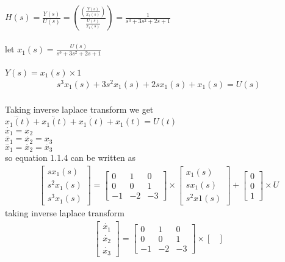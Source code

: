 \begin{enumerate}[label=\thesection.\arabic*.,ref=\thesection.\theenumi]
\\
\\ $H(s)=\frac{Y(s)}{U(s)}=(\frac{(\frac{Y(s)}{x_{1}(s)})}{\frac{U(s)}{x_{1}(s)}})=\frac{1}{s^3+3s^2+2s+1} $
\\
\\let   $x_{1}(s)=\frac{U(s)}{s^3+3s^2+2s+1}$
\\
\\$Y(s)=x_{1}(s)\times 1 $
\begin{align}
s^3x_{1}(s)+3s^2x_{1}(s)+2sx_{1}(s)+x_{1}(s)=U(s)
\end{align}
\\ Taking inverse laplace transform we get
\\$\dddot{x_{1}(t)}+\ddot{x_{1}(t)}+\dot{x_{1}(t)}+x_{1}(t)=U(t)$
\\$\dot{x_{1}}=x_{2}$
\\$\ddot{x_{1}}=\dot{x_{2}}=x_{3}$
\\$\dddot{x_{1}}=\ddot{x_{2}}=\dot{x_{3}}$
\\ so equation 1.1.4 can be written as
\\
\begin{gather}
\begin{bmatrix}
sx_{1}(s)\\
s^2x_{1}(s)\\
s^3x_{1}(s)
\end{bmatrix}
=
\begin{bmatrix}
0&1&0\\
0&0&1\\
-1&-2&-3
\end{bmatrix}\times \begin{bmatrix}
x_{1}(s)\\
sx_{1}(s)\\
s^2x{1}(s)
\end{bmatrix}
+
\begin{bmatrix}
0\\
0\\
1
\end{bmatrix} \times U
\end{gather}
taking inverse laplace transform
\begin{gather}
\begin{bmatrix}
\dot{x_{1}}\\
\dot{x_{2}}\\
\dot{x_{3}}
\end{bmatrix}
=
\begin{bmatrix}
0&1&0\\
0&0&1\\
-1&-2&-3
\end{bmatrix}\times \begin{bmatrix}

\end{bmatrix}
\end{gather}
\end{enumerate}

